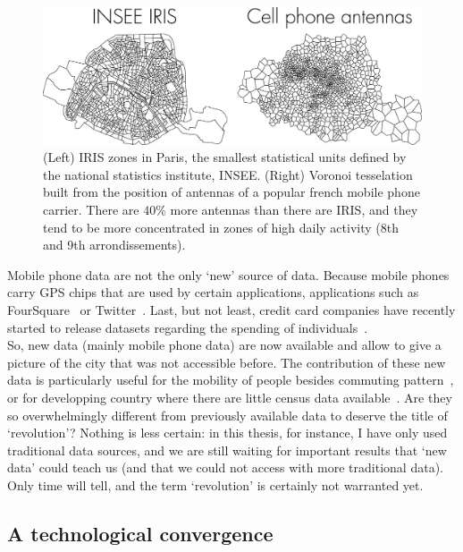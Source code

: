 \begin{figure}
    \centering
    \includegraphics[width=\textwidth]{gfx/chapter-intro/IRIS_phone.pdf}
    \caption{(Left) IRIS zones in Paris, the smallest statistical units defined
    by the national statistics institute, INSEE. (Right) Voronoi tesselation
    built from the position of antennas of a popular french mobile phone carrier.
    There are $40\%$ more antennas than there are IRIS, and they tend to be more
    concentrated in zones of high daily activity (8th and 9th
    arrondissements).\label{fig:IRIS_phone}}
\end{figure}

Mobile phone data are not the only `new' source of data. Because mobile phones carry
GPS chips that are used by certain applications, applications such as
FourSquare~\cite{Noulas:2012} or Twitter~\cite{Lenormand:2014_tweets}. Last, but
not least, credit card companies have recently started to release datasets
regarding the spending of individuals~\cite{Lenormand:2015}.\\

So, new data (mainly mobile phone data) are now available and allow to give a
picture of the city that was not accessible before. The contribution of these new
data is particularly useful for the mobility of people besides commuting
pattern~\cite{Louail:2014}, or for developping country where there are little
census data available~\cite{Blondel:2012}. Are they so overwhelmingly different
from previously available data to deserve the title of `revolution'? Nothing is
less certain: in this thesis, for instance, I have only used traditional data
sources, and we are still waiting for important results that `new data' could teach
us (and that we could not access with more traditional data). Only time will tell,
and the term `revolution' is certainly not warranted yet.



\subsection{A technological convergence}
\label{sub:a_technological_convergence} 

